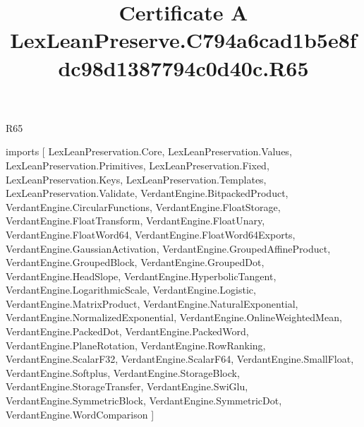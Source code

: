 \begin{lexlean}{R65}
\title{Certificate A LexLeanPreserve.C794a6cad1b5e8fdc98d1387794c0d40c.R65}
\begin{coremodule}
imports [
  LexLeanPreservation.Core,
  LexLeanPreservation.Values,
  LexLeanPreservation.Primitives,
  LexLeanPreservation.Fixed,
  LexLeanPreservation.Keys,
  LexLeanPreservation.Templates,
  LexLeanPreservation.Validate,
  VerdantEngine.BitpackedProduct,
  VerdantEngine.CircularFunctions,
  VerdantEngine.FloatStorage,
  VerdantEngine.FloatTransform,
  VerdantEngine.FloatUnary,
  VerdantEngine.FloatWord64,
  VerdantEngine.FloatWord64Exports,
  VerdantEngine.GaussianActivation,
  VerdantEngine.GroupedAffineProduct,
  VerdantEngine.GroupedBlock,
  VerdantEngine.GroupedDot,
  VerdantEngine.HeadSlope,
  VerdantEngine.HyperbolicTangent,
  VerdantEngine.LogarithmicScale,
  VerdantEngine.Logistic,
  VerdantEngine.MatrixProduct,
  VerdantEngine.NaturalExponential,
  VerdantEngine.NormalizedExponential,
  VerdantEngine.OnlineWeightedMean,
  VerdantEngine.PackedDot,
  VerdantEngine.PackedWord,
  VerdantEngine.PlaneRotation,
  VerdantEngine.RowRanking,
  VerdantEngine.ScalarF32,
  VerdantEngine.ScalarF64,
  VerdantEngine.SmallFloat,
  VerdantEngine.Softplus,
  VerdantEngine.StorageBlock,
  VerdantEngine.StorageTransfer,
  VerdantEngine.SwiGlu,
  VerdantEngine.SymmetricBlock,
  VerdantEngine.SymmetricDot,
  VerdantEngine.WordComparison
]


\end{coremodule}
\end{lexlean}
